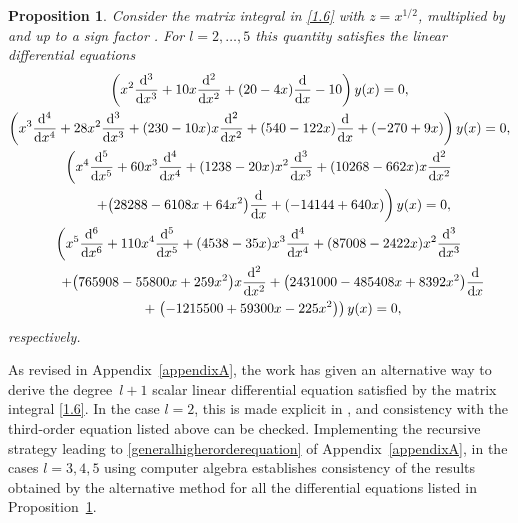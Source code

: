 \documentclass[pdftex]{sigma}
\numberwithin{equation}{section}
\newtheorem{Proposition}[Theorem]{Proposition}
\theoremstyle{definition}
\begin{document}
\begin{Proposition}\label{P3.5}
Consider the matrix integral in \eqref{1.6} with $z = x^{1/2}$, multiplied by  and up to a sign factor .
For $l=2,\dots,5$ this quantity satisfies the linear differential equations
\begin{gather*}
 \left (
 x^2 {{\rm d}^3 \over{\rm d} x^3} + 10 x {{\rm d}^2 \over{\rm d} x^2} + (20 - 4 x) {{\rm d} \over{\rm d} x} - 10 \right ) y(x) = 0, \\
 \left (
x^3 {{\rm d}^4 \over{\rm d} x^4} + 28 x^2 {{\rm d}^3 \over{\rm d} x^3} + (230 - 10 x) x {{\rm d}^2 \over{\rm d} x^2}+
(540-122 x) {{\rm d} \over{\rm d} x} + (-270 + 9x) \right ) y(x) = 0, \\
\left (
x^4 {{\rm d}^5 \over{\rm d} x^5} + 60 x^3 {{\rm d}^4 \over{\rm d} x^4} + (1238 - 20 x) x^2 {{\rm d}^3 \over{\rm d} x^3}+ (10268 - 662 x) x {{\rm d}^2 \over{\rm d} x^2}
\right.\\
\left.\qquad +\bigl(28288-6108 x +64 x^2\bigr) {{\rm d} \over{\rm d} x} + (-14144 +640 x) \right ) y(x) = 0 ,\\
\left (
x^5 {{\rm d}^6 \over{\rm d} x^6} + 110 x^4 {{\rm d}^5 \over{\rm d} x^5} + (4538 - 35 x) x^3 {{\rm d}^4 \over{\rm d} x^4}+ (87008 - 2422 x) x^2 {{\rm d}^3 \over{\rm d} x^3}
\right.\\
\qquad+\bigl( 765908 - 55800 x + 259 x^2\bigr) x{{\rm d}^2 \over{\rm d} x^2} +
\bigl( 2431000 -485408 x + 8392 x^2\bigr)
{{\rm d} \over{\rm d} x} \\
\qquad +
\left.\bigl(-1215500 + 59300 x -225 x^2 \bigr) \right ) y(x) = 0,
\end{gather*}
respectively.
\end{Proposition}

As revised in Appendix~\ref{appendixA}, the work \cite{KW24b} has given an alternative way to derive the degree~${l+1}$ scalar linear differential equation satisfied by
the matrix integral \eqref{1.6}. In the case $l=2$, this is made explicit in
\cite[equation~(97)]{KW24b}, and consistency with the third-order equation listed above can be checked. Implementing the recursive strategy leading to
\eqref{generalhigherorderequation} of Appendix~\ref{appendixA}, in the cases $l=3,4,5$ using computer algebra establishes consistency of the results obtained by the alternative method for all the differential equations listed in Proposition~\ref{P3.5}.
\end{document}
